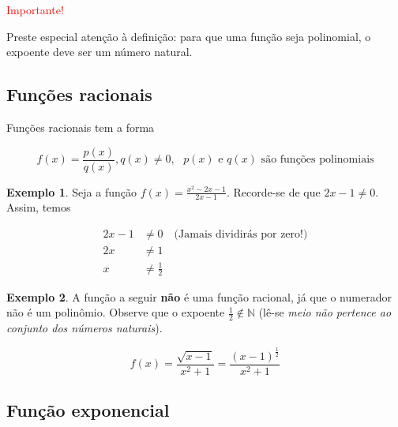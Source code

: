 \documentclass[12pt,openright,twoside,a4paper]{article}
\theoremstyle{definition}
\newtheorem{example}{Exemplo}[section]
\begin{document}
	\begin{snugshade}
		\textcolor{red}{Importante!}
		
		Preste especial atenção à definição: para que uma função seja polinomial, o expoente deve ser um número natural. 
	\end{snugshade}
	
	\subsection{Funções racionais}
	Funções racionais tem a forma
	
	\begin{equation}
		f(x) = \frac{p(x)}{q(x)}, q(x) \neq 0, \text{ $p(x)$ e $q(x)$ são funções polinomiais}
	\end{equation}
	
	\begin{example}
		Seja a função $f(x) = \displaystyle \frac{x^2 - 2x - 1}{2x-1}$. Recorde-se de que $2x-1 \neq 0$. Assim, temos
		
		\begin{align*}
			2x - 1 &\neq 0 \quad \text{(Jamais dividirás por zero!)}\\
			2x &\neq 1\\
			x &\neq \frac{1}{2}
		\end{align*}
	\end{example}
	
	\begin{example} A função a seguir \textbf{não} é uma função racional, já que o numerador não é um polinômio. Observe que o expoente $\displaystyle\frac{1}{2} \notin \mathbb{N}$ (lê-se \textit{meio não pertence ao conjunto dos números naturais}).
		
		\begin{equation*}
			f(x) = \frac{\sqrt{x-1}}{x^2+1} = \frac{(x-1)^{\frac{1}{2}}}{x^2+1}
		\end{equation*}
	\end{example}
	
	\subsection{Função exponencial}
	
\end{document}
